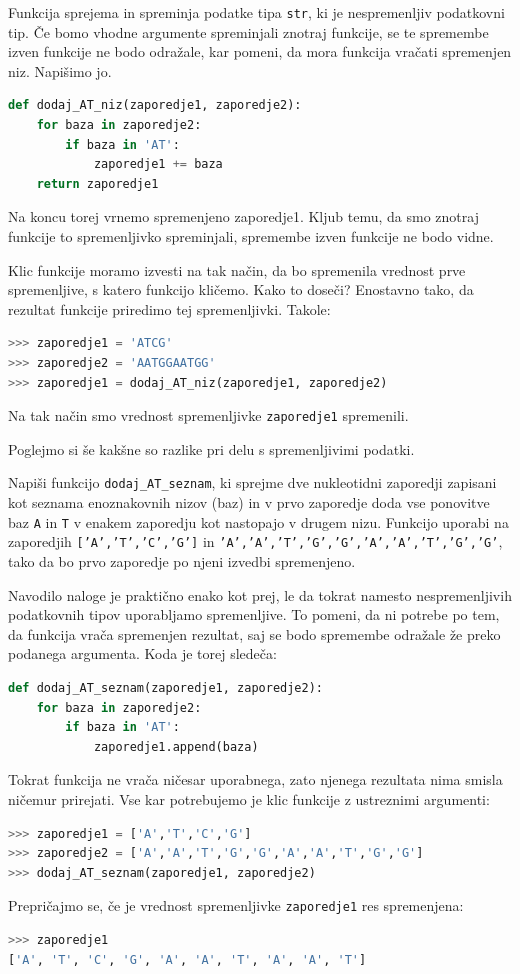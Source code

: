 \begin{resitev}
Funkcija sprejema in spreminja podatke tipa \texttt{str}, ki je nespremenljiv podatkovni tip. Če bomo vhodne argumente spreminjali znotraj funkcije, se te spremembe izven funkcije ne bodo odražale, kar pomeni, da mora funkcija vračati spremenjen niz. Napišimo jo.
\begin{lstlisting}[language=Python]
def dodaj_AT_niz(zaporedje1, zaporedje2):
    for baza in zaporedje2:
        if baza in 'AT':
            zaporedje1 += baza
    return zaporedje1
\end{lstlisting}
Na koncu torej vrnemo spremenjeno zaporedje1. Kljub temu, da smo znotraj funkcije to spremenljivko spreminjali, spremembe izven funkcije ne bodo vidne.

Klic funkcije moramo izvesti na tak način, da bo spremenila vrednost prve spremenljive, s katero funkcijo kličemo. Kako to doseči? Enostavno tako, da rezultat funkcije priredimo tej spremenljivki. Takole:
\begin{lstlisting}[language=Python]
>>> zaporedje1 = 'ATCG'
>>> zaporedje2 = 'AATGGAATGG'
>>> zaporedje1 = dodaj_AT_niz(zaporedje1, zaporedje2)
\end{lstlisting}
Na tak način smo vrednost spremenljivke \texttt{zaporedje1} spremenili.
\end{resitev}

Poglejmo si še kakšne so razlike pri delu s spremenljivimi podatki.
\begin{zgled}
Napiši funkcijo \texttt{dodaj\_AT\_seznam}, ki sprejme dve nukleotidni zaporedji zapisani kot seznama enoznakovnih nizov (baz) in v prvo zaporedje doda vse ponovitve baz \texttt{A} in \texttt{T} v enakem zaporedju kot nastopajo v drugem nizu. Funkcijo uporabi na zaporedjih \texttt{['A','T','C','G']} in \texttt{'A','A','T','G','G','A','A','T','G','G'}, tako da bo prvo zaporedje po njeni izvedbi spremenjeno.
\end{zgled}
\begin{resitev}
Navodilo naloge je praktično enako kot prej, le da tokrat namesto nespremenljivih podatkovnih tipov uporabljamo spremenljive. To pomeni, da ni potrebe po tem, da funkcija vrača spremenjen rezultat, saj se bodo spremembe odražale že preko podanega argumenta. Koda je torej sledeča:
\begin{lstlisting}[language=Python]
def dodaj_AT_seznam(zaporedje1, zaporedje2):
    for baza in zaporedje2:
        if baza in 'AT':
            zaporedje1.append(baza)
\end{lstlisting}
Tokrat funkcija ne vrača ničesar uporabnega, zato njenega rezultata nima smisla ničemur prirejati. Vse kar potrebujemo je klic funkcije z ustreznimi argumenti:
\begin{lstlisting}[language=Python]
>>> zaporedje1 = ['A','T','C','G']
>>> zaporedje2 = ['A','A','T','G','G','A','A','T','G','G']
>>> dodaj_AT_seznam(zaporedje1, zaporedje2) 
\end{lstlisting}
Prepričajmo se, če je vrednost spremenljivke \texttt{zaporedje1} res spremenjena:
\begin{lstlisting}[language=Python]
>>> zaporedje1
['A', 'T', 'C', 'G', 'A', 'A', 'T', 'A', 'A', 'T']
\end{lstlisting}
\end{resitev}